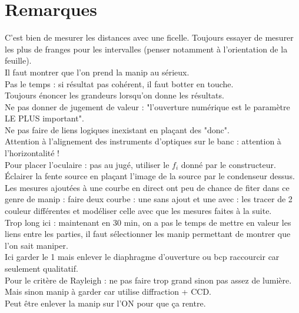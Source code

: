\documentclass[12pt,prb,aps,epsf]{report}
\begin{document}
\section{Remarques}
C'est bien de mesurer les distances avec une ficelle. Toujours essayer de mesurer les plus de franges pour les intervalles (penser notamment à l'orientation de la feuille).\\
Il faut montrer que l'on prend la manip au sérieux.\\
Pas le temps : si résultat pas cohérent, il faut botter en touche.\\
Toujours énoncer les grandeurs lorsqu'on donne les résultats.\\
Ne pas donner de jugement de valeur : "l'ouverture numérique est le paramètre LE PLUS important".\\
Ne pas faire de liens logiques inexistant en plaçant des "donc".\\
Attention à l'alignement des instruments d'optiques sur le banc : attention à l'horizontalité !\\
Pour placer l'oculaire : pas au jugé, utiliser le $f_i$ donné par le constructeur.\\
Éclairer la fente source en plaçant l'image de la source par le condenseur dessus.\\
Les mesures ajoutées à une courbe en direct ont peu de chance de fiter dans ce genre de manip : faire deux courbe : une sans ajout et une avec : les tracer de 2 couleur différentes et modéliser celle avec que les mesures faites à la suite.\\

Trop long ici : maintenant en 30 min, on a pas le temps de mettre en valeur les liens entre les parties, il faut sélectionner les manip permettant de montrer que l'on sait maniper.\\
Ici garder le 1 mais enlever le diaphragme d'ouverture ou bcp raccourcir car seulement qualitatif.\\
Pour le critère de Rayleigh : ne pas faire trop grand sinon pas assez de lumière. Mais sinon manip à garder car utilise diffraction + CCD.\\
Peut être enlever la manip sur l'ON pour que ça rentre.
\end{document}
